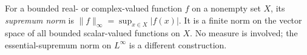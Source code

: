 
For a bounded real- or complex-valued function $f$ on a nonempty set $X$, its \emph{supremum norm} is $\|f\|_\infty=\sup_{x\in X}|f(x)|$. It is a finite norm on the vector space of all bounded scalar-valued functions on $X$. No measure is involved; the essential-supremum norm on $L^\infty$ is a different construction.
